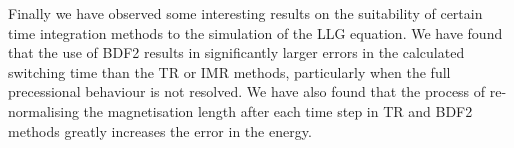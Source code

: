 Finally we have observed some interesting results on the suitability of certain time integration methods to the simulation of the LLG equation.
We have found that the use of BDF2 results in significantly larger errors in the calculated switching time than the TR or IMR methods, particularly when the full precessional behaviour is not resolved.
We have also found that the process of re-normalising the magnetisation length after each time step in TR and BDF2 methods greatly increases the error in the energy.


